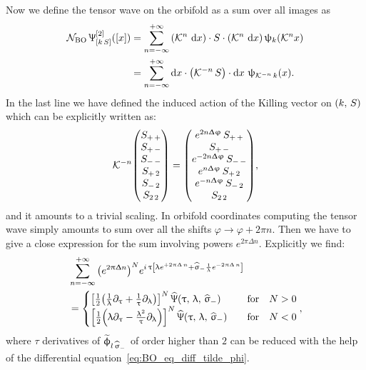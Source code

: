 Now we define the tensor wave on the orbifold as a sum over all images as
\begin{equation}
  \begin{split}
    \mathcal{N}_{\text{BO}}\,
    \Uppsi^{[2]}_{\qty[k\, S]}\qty(\qty[x])
    & =
    \sum\limits_{n = -\infty}^{+\infty}
    \qty( \mathcal{K}^n\, \dd{x} ) \cdot S \cdot \qty( \mathcal{K}^n\, \dd{x} )\,
    \uppsi_{k}( \mathcal{K}^n x)
    \\
    & =
    \sum\limits_{n = -\infty}^{+\infty}
    \dd{x} \cdot \qty( \mathcal{K}^{-n}\, S ) \cdot \dd{x}\,
    \uppsi_{ \mathcal{K}^{-n}\, k}(x).
  \end{split}
\end{equation}
In the last line we have defined the induced action of the Killing vector on $\qty(k,\, S)$ which can be explicitly written as:
\begin{equation}
  \cK^{-n}
  \mqty(%
    S_{ +\, + } \\
    S_{ +\, - } \\
    S_{ -\, - } \\
    S_{ +\, 2 } \\
    S_{ -\,  2} \\
    S_{ 2\, 2 }
  )
  =
  \mqty(
    e^{2 n \Delta \varphi}\, S_{ +\, + } \\
    S_{ +\, - } \\
    e^{-2 n \Delta \varphi}\, S_{ -\, - } \\
    e^{n \Delta \varphi}\, S_{ +\, 2 } \\
    e^{-n \Delta \varphi}\, S_{-\, 2} \\
    S_{ 2\, 2 } 
  )
  ,
\end{equation}
and it amounts to a trivial scaling.
In orbifold coordinates computing the tensor wave simply amounts to sum over all the shifts $\varphi \rightarrow \varphi + 2 \pi n$.
Then we have to give a close  expression for the sum involving powers $e^{2 \pi \Delta n}$.
Explicitly we find:
\begin{equation}
  \begin{split}
    & \infinfsum{n}
    \qty( e^{2 \pi \Delta n} )^N
    e^{%
      i\, \tau \qty[%
        \lambda e^{+2\pi\Delta\,n}
        +
        \hsigma_- \frac{1}{\lambda} e^{-2\pi\Delta\,n} 
      ]
    }
    \\
    & =
    \begin{cases}
      \qty[%
        \frac{1}{2}
        \qty(%
          \frac{1}{\lambda} \ipd{\tau}
          +
          \frac{1}{\tau} \ipd{\lambda}
        )
      ]^N\,
      \hPsi\qty(\tau,\, \lambda,\, \hsigma_-)
      & \qfor
      N > 0
      \\
      \qty[%
        \frac{1}{2}
        \qty(%
          \lambda \ipd{\tau}
          -
          \frac{\lambda^2}{\tau} \ipd{\lambda}
        )
      ]^N\,
      \hPsi\qty(\tau,\, \lambda,\, \hsigma_-)
      & \qfor
      N < 0
    \end{cases},
  \end{split}
\end{equation}
where $\tau$ derivatives of $\widetilde{\upphi}_{l\, \widehat{\upsigma}_-}$ of order higher than $2$  can be reduced with the help of the differential equation~\eqref{eq:BO_eq_diff_tilde_phi}.
  
